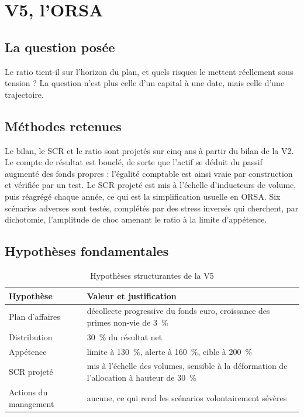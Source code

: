\documentclass[11pt,a4paper]{article}
\begin{document}
\section{V5, l'ORSA}

\subsection{La question posée}

Le ratio tient-il sur l'horizon du plan, et quels risques le mettent réellement sous tension ? La
question n'est plus celle d'un capital à une date, mais celle d'une trajectoire.

\subsection{Méthodes retenues}

Le bilan, le SCR et le ratio sont projetés sur cinq ans à partir du bilan de la V2. Le compte de
résultat est bouclé, de sorte que l'actif se déduit du passif augmenté des fonds propres :
l'égalité comptable est ainsi vraie par construction et vérifiée par un test. Le SCR projeté est
mis à l'échelle d'inducteurs de volume, puis réagrégé chaque année, ce qui est la simplification
usuelle en ORSA. Six scénarios adverses sont testés, complétés par des stress inversés qui
cherchent, par dichotomie, l'amplitude de choc amenant le ratio à la limite d'appétence.

\subsection{Hypothèses fondamentales}

\begin{table}[H]\centering\small
\caption{Hypothèses structurantes de la V5}
\begin{tabularx}{\linewidth}{lX}
\toprule
\textbf{Hypothèse} & \textbf{Valeur et justification}\\
\midrule
Plan d'affaires & décollecte progressive du fonds euro, croissance des primes non-vie de
\qty{3}{\percent}\\
Distribution & \qty{30}{\percent} du résultat net\\
Appétence & limite à \qty{130}{\percent}, alerte à \qty{160}{\percent}, cible à
\qty{200}{\percent}\\
SCR projeté & mis à l'échelle des volumes, sensible à la déformation de l'allocation à hauteur de
\qty{30}{\percent}\\
Actions du management & aucune, ce qui rend les scénarios volontairement sévères\\
\bottomrule
\end{tabularx}
\end{table}
\end{document}
